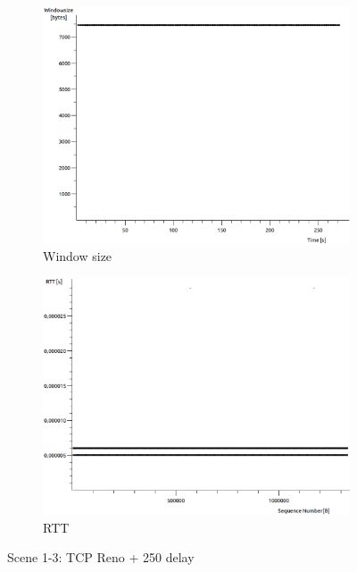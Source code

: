\documentclass[conference,a4paper]{../../sty/IEEEtran}
\begin{document}
\begin{figure}
\begin{subfigure}[b]{0.2\textwidth}
  \includegraphics[width=\textwidth]{s1-3_wnd}
  \caption{Window size}
 \end{subfigure}
 \begin{subfigure}[b]{0.2\textwidth}
  \includegraphics[width=\textwidth]{s1-3_rtt}
  \caption{RTT}
 \end{subfigure}
 \caption{Scene 1-3: TCP Reno + 250 delay}
\end{figure}
\end{document}
